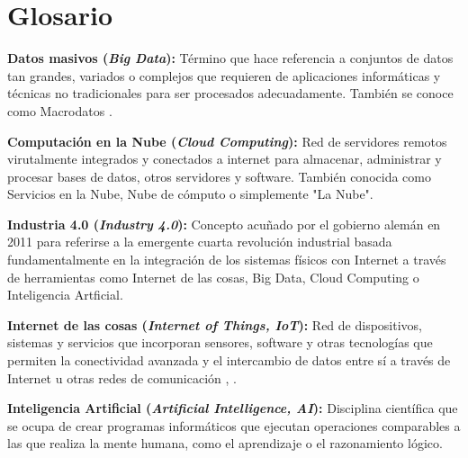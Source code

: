 \chapter{Glosario}\label{anexo:glosario}







\textbf{Datos masivos (\textit{Big Data}):} Término que hace referencia a conjuntos de datos tan grandes, variados o complejos que requieren de aplicaciones informáticas y técnicas no tradicionales para ser procesados adecuadamente. También se conoce como Macrodatos \cite{macrodatoswiki}.


\textbf{Computación en la Nube (\textit{Cloud Computing}):} Red de servidores remotos virutalmente integrados y conectados a internet para almacenar, administrar y procesar bases de datos, otros servidores y software. También conocida como Servicios en la Nube, Nube de cómputo o simplemente "La Nube". \cite{wikipediacomputacionnube}






\textbf{Industria 4.0 (\textit{Industry 4.0}):} Concepto acuñado por el gobierno alemán en 2011 para referirse a la emergente cuarta revolución industrial basada fundamentalmente en la integración de los sistemas físicos con Internet a través de herramientas como Internet de las cosas, Big Data, Cloud Computing o Inteligencia Artficial.

\textbf{Internet de las cosas (\textit{Internet of Things, IoT}):} Red de dispositivos, sistemas y servicios que incorporan sensores, software y otras tecnologías que permiten la conectividad avanzada y el intercambio de datos entre sí a través de Internet u otras redes de comunicación \cite{oracleiot}, \cite{wikipediaiot}.

\textbf{Inteligencia Artificial (\textit{Artificial Intelligence, AI}):} Disciplina científica que se ocupa de crear programas informáticos que ejecutan operaciones comparables a las que realiza la mente humana, como el aprendizaje o el razonamiento lógico. \cite{rae}

